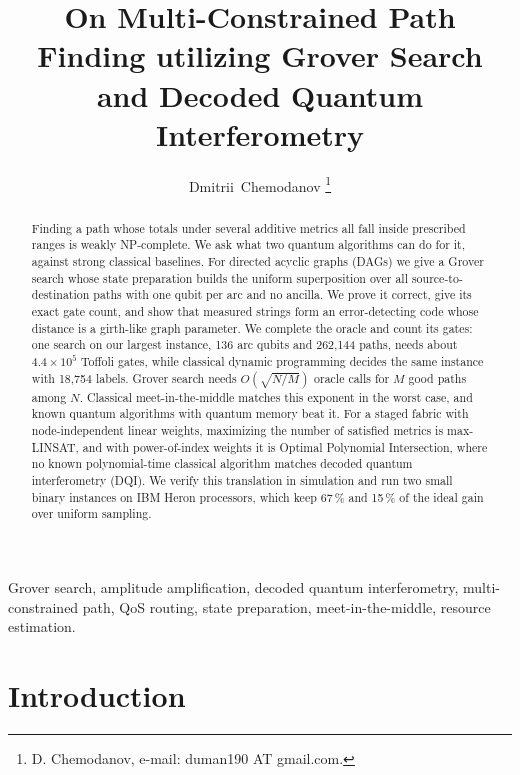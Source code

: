 \documentclass[journal]{IEEEtran}
\begin{document}
\title{On Multi-Constrained Path Finding utilizing Grover Search and Decoded Quantum Interferometry}

\author{Dmitrii~Chemodanov%
\thanks{D. Chemodanov, e-mail: duman190 AT gmail.com.}}

\maketitle

\begin{abstract}
Finding a path whose totals under several additive metrics all fall inside prescribed ranges is weakly NP-complete. We ask what two quantum algorithms can do for it, against strong classical baselines. For directed acyclic graphs (DAGs) we give a Grover search whose state preparation builds the uniform superposition over all source-to-destination paths with one qubit per arc and no ancilla. We prove it correct, give its exact gate count, and show that measured strings form an error-detecting code whose distance is a girth-like graph parameter. We complete the oracle and count its gates: one search on our largest instance, 136 arc qubits and 262{,}144 paths, needs about $4.4\times10^{5}$ Toffoli gates, while classical dynamic programming decides the same instance with 18{,}754 labels. Grover search needs $O(\sqrt{N/M})$ oracle calls for $M$ good paths among $N$. Classical meet-in-the-middle matches this exponent in the worst case, and known quantum algorithms with quantum memory beat it. For a staged fabric with node-independent linear weights, maximizing the number of satisfied metrics is max-LINSAT, and with power-of-index weights it is Optimal Polynomial Intersection, where no known polynomial-time classical algorithm matches decoded quantum interferometry (DQI). We verify this translation in simulation and run two small binary instances on IBM Heron processors, which keep 67\,\% and 15\,\% of the ideal gain over uniform sampling.
\end{abstract}

\begin{IEEEkeywords}
Grover search, amplitude amplification, decoded quantum interferometry, multi-constrained path, QoS routing, state preparation, meet-in-the-middle, resource estimation.
\end{IEEEkeywords}

\section{Introduction}
\end{document}

